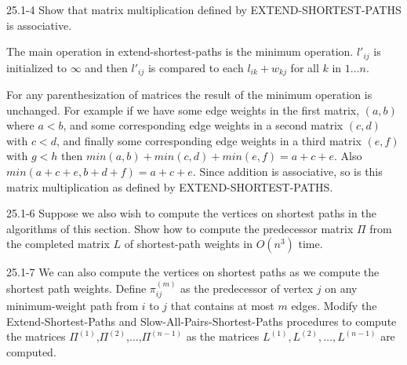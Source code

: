 \begin{problem}{25.1-4}
  Show that matrix multiplication defined by EXTEND-SHORTEST-PATHS is associative.
  \begin{solution}
    The main operation in extend-shortest-paths is the minimum operation. $l'_{ij}$ is initialized to $\infty$ and then $l'_{ij}$ is compared to each $l_{ik} + w_{kj}$ for all $k$ in $1\ldots n$.

    For any parenthesization of matrices the result of the minimum operation is unchanged. For example if we have some
    edge weights in the first matrix, $(a, b)$ where $a < b$, and some corresponding edge weights in a second matrix
    $(c, d)$ with $c < d$, and finally some corresponding edge weights in a third matrix $(e, f)$ with $g < h$ then
    $min(a,b) + min(c,d) + min(e, f) = a + c + e$. Also $min(a + c + e, b + d + f) = a + c + e$.  Since addition is
    associative, so is this matrix multiplication as defined by EXTEND-SHORTEST-PATHS.
  \end{solution}
\end{problem}

\begin{problem}{25.1-6}
Suppose we also wish to compute the vertices on shortest paths in the algorithms of this section. Show how to compute
the predecessor matrix $\Pi$ from the completed matrix $L$ of shortest-path weights in $O(n^3)$ time.
\end{problem}

\begin{problem}{25.1-7}
  We can also compute the vertices on shortest paths as we compute the shortest path weights.  Define $\pi^{(m)}_{ij}$
  as the predecessor of vertex $j$ on any minimum-weight path from $i$ to $j$ that contains at most $m$ edges.  Modify
  the Extend-Shortest-Paths and Slow-All-Pairs-Shortest-Paths procedures to compute the matrices
  $\Pi^{(1)}$,$\Pi^{(2)}$,$\ldots$,$\Pi^{(n-1)}$ as the matrices $L^{(1)},L^{(2)},\ldots,L^{(n-1)}$ are computed.
\end{problem}


